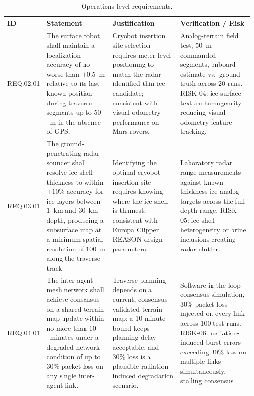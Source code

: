 \documentclass[11pt]{article}
\begin{document}
\begin{table}[H]
\centering
\small
\begin{tabular}{p{1.5cm}p{5.3cm}p{4cm}p{3.2cm}}
\toprule
\textbf{ID} & \textbf{Statement} & \textbf{Justification} & \textbf{Verification / Risk} \\
\midrule
REQ.02.01 &
The surface robot shall maintain a localization accuracy of no worse than $\pm 0.5$~m relative
to its last known position during traverse segments up to $50$~m in the absence of GPS. &
Cryobot insertion site selection requires meter-level positioning to match the radar-identified
thin-ice candidate; consistent with visual odometry performance on Mars rovers. &
Analog-terrain field test, 50~m commanded segments, onboard estimate vs.\ ground truth across 20
runs. RISK-04: ice surface texture homogeneity reducing visual odometry feature tracking. \\
\addlinespace
REQ.03.01 &
The ground-penetrating radar sounder shall resolve ice shell thickness to within $\pm 10\%$
accuracy for ice layers between $1$~km and $30$~km depth, producing a subsurface map at a
minimum spatial resolution of $100$~m along the traverse track. &
Identifying the optimal cryobot insertion site requires knowing where the ice shell is
thinnest; consistent with Europa Clipper REASON design parameters. &
Laboratory radar range measurements against known-thickness ice-analog targets across the full
depth range. RISK-05: ice-shell heterogeneity or brine inclusions creating radar clutter. \\
\addlinespace
REQ.04.01 &
The inter-agent mesh network shall achieve consensus on a shared terrain map update within no
more than $10$~minutes under a degraded network condition of up to $30\%$ packet loss on any
single inter-agent link. &
Traverse planning depends on a current, consensus-validated terrain map; a 10-minute bound keeps
planning delay acceptable, and $30\%$ loss is a plausible radiation-induced degradation
scenario. &
Software-in-the-loop consensus simulation, $30\%$ packet loss injected on every link across 100
test runs. RISK-06: radiation-induced burst errors exceeding $30\%$ loss on multiple links
simultaneously, stalling consensus. \\
\bottomrule
\end{tabular}
\caption{Operations-level requirements.}
\label{tab:ops-level-reqs}
\end{table}

\end{document}
